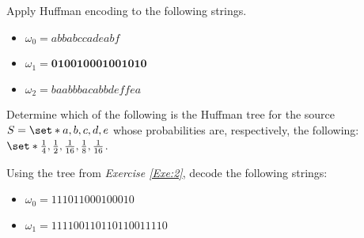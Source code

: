 \documentclass{subfiles}
\begin{document}
    \begin{exercise}\label{Exe:1}
        Apply Huffman encoding to the following strings.
        \begin{itemize}
            \item \(\omega_{0} = abbabccadeabf\)
            \item \(\omega_{1} = \textbf{010010001001010}\)
            \item \(\omega_{2} = baabbbacabbdeffea\)
        \end{itemize}
    \end{exercise}
    \begin{exercise}\label{Exe:2}
        Determine which of the following is the Huffman tree for the source 
            \(S = \set*{a, b, c, d, e}\) whose probabilities are,
        respectively, the following: 
            \(\set*{\tfrac{1}{4}, 
                \tfrac{1}{2},
                \tfrac{1}{16}, 
                \tfrac{1}{8}, 
                \tfrac{1}{16}}\).
        
    \end{exercise}
    \begin{exercise}
        Using the tree from \emph{Exercise \ref{Exe:2}},
        decode the following strings: 
        \begin{itemize}
            \item \(\omega_{0} = 111011000100010\)
            \item \(\omega_{1} = 111100110110110011110\) 
        \end{itemize}
    \end{exercise}
\end{document}
